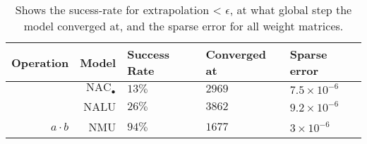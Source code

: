 \begin{table}[H]

\caption{\label{tab:very-simple-function-results}Shows the sucess-rate for extrapolation < $\epsilon$, at what global step the model converged at, and the sparse error for all weight matrices.}
\centering
\begin{tabular}{rrlll}
\toprule
Operation & Model & Success Rate & Converged at & Sparse error\\
\midrule
 & ${\mathrm{NAC}_\bullet}$ & $13\%$ & $2969$ & $7.5 \times 10^{-6}$\\

 & NALU & $26\%$ & $3862$ & $9.2 \times 10^{-6}$\\

\multirow{-3}{*}{\raggedleft\arraybackslash $a \cdot b$} & NMU & $94\%$ & $1677$ & $3 \times 10^{-6}$\\
\bottomrule
\end{tabular}
\end{table}
